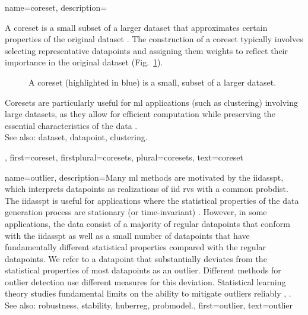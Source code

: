 {name={coreset}, 
	description={A coreset is a small subset of a larger \gls{dataset} 
		that approximates certain properties of the original \gls{dataset} \cite{Chai2023}. 
		The construction of a coreset typically involves selecting representative \glspl{datapoint}
		and assigning them weights to reflect their importance in the original \gls{dataset} (Fig.\ \ref{fig_coreset_dict}).
        \begin{figure}[H]
			\centering
\caption{A coreset (highlighted in blue) is a small, subset of a larger \gls{dataset}. \label{fig_coreset_dict}}
\end{figure}
		Coresets are particularly useful for \gls{ml} applications (such as \gls{clustering}) 
		involving large \glspl{dataset}, as they allow for efficient computation while 
		preserving the essential characteristics of the \gls{data} \cite{DistkmeansBalcan2013}.
				\\
		See also: \gls{dataset}, \gls{datapoint}, \gls{clustering}.},
	first={coreset},
	firstplural={coresets},
	plural={coresets},
	text={coreset} 
}


{name={outlier}, 
	description={Many \gls{ml} methods 
		are motivated by the \gls{iidasspt}, which interprets \glspl{datapoint} as \glspl{realization} of 
		\gls{iid} \glspl{rv} with a common \gls{probdist}. The \gls{iidasspt} is useful for applications  
		where the statistical properties of the \gls{data} generation process are stationary (or time-invariant) \cite{Brockwell91}. 
		However, in some applications, the \gls{data} consist of a majority of regular \glspl{datapoint} 
		that conform with the \gls{iidasspt} as well as a small number of \glspl{datapoint} that have fundamentally different 
       		statistical properties compared with the regular \glspl{datapoint}. We refer to 
			a \gls{datapoint} that substantially deviates from the statistical properties of 
			    most \glspl{datapoint} as an outlier. Different methods for outlier detection 
				use different measures for this deviation. 
        		Statistical learning theory studies fundamental limits on the ability to 
				mitigate outliers reliably \cite{doi:10.1137/0222052}, \cite{10.1214/20-AOS1961}.
        		\\
		See also: \gls{robustness}, \gls{stability}, \gls{huberreg}, \gls{probmodel}.},
	 first={outlier},
	 text={outlier} 
}

